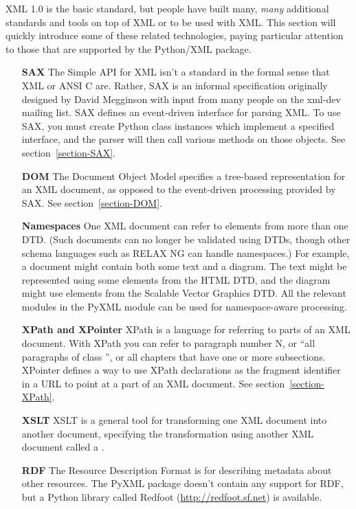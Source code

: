 \documentclass{howto}
\begin{document}
XML 1.0 is the basic standard, but people have built many, \emph{many}
additional standards and tools on top of XML or to be used with XML.
This section will quickly introduce some of these related
technologies, paying particular attention to those that are supported
by the Python/XML package.

\begin{itemize}

  \item[\textbf{SAX}] 
The Simple API for XML isn't a standard in the formal sense that XML
or ANSI C are.  Rather, SAX is an informal specification originally
designed by David Megginson with input from many people on the xml-dev
mailing list.  SAX defines an event-driven interface for parsing XML.
To use SAX, you must create Python class instances which implement a
specified interface, and the parser will then call various methods on
those objects.  See section~\ref{section-SAX}.

  \item[\textbf{DOM}] 
The Document Object Model specifies a tree-based representation for an
XML document, as opposed to the event-driven processing provided by
SAX.  See section~\ref{section-DOM}.

  \item[\textbf{Namespaces}] One XML document can refer to elements
  from more than one DTD.  (Such documents can no longer be validated
  using DTDs, though other schema languages such as RELAX NG can
  handle namespaces.) For example, a document might contain both some
  text and a diagram.  The text might be represented using some
  elements from the HTML DTD, and the diagram might use elements from
  the Scalable Vector Graphics DTD.  All the relevant modules in the
  PyXML module can be used for namespace-aware processing.

  \item[\textbf{XPath and XPointer}]
  XPath is a language for referring to parts of an XML document.  With
XPath you can refer to paragraph number N, or ``all paragraphs of
class '', or all chapters that have one or more
subsections.
XPointer defines a way to use XPath declarations as the fragment
identifier in a URL to point at a part of an XML document.
See section~\ref{section-XPath}.

  \item[\textbf{XSLT}] 
XSLT is a general tool for transforming one XML document
into another document, specifying the transformation using 
another XML document called a .
\begin{comment}
  See section~\ref{section-XSLT}.
\end{comment}

  \item[\textbf{RDF}] 
  The Resource Description Format is for describing metadata about 
  other resources.  The PyXML package doesn't contain any support
  for RDF, but a Python library called Redfoot
  (\url{http://redfoot.sf.net}) is available.

\end{itemize}
\end{document}
